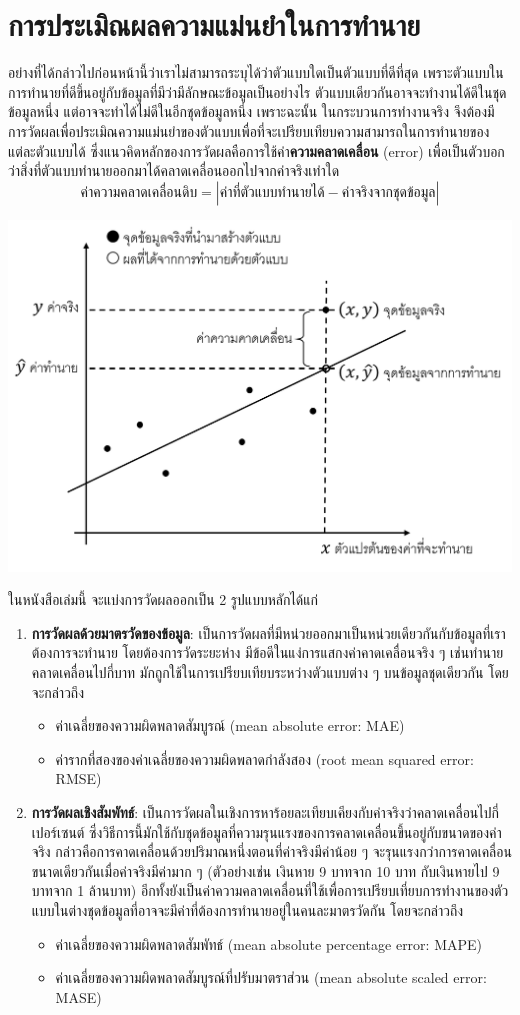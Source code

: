 \section{การประเมิณผลความแม่นยำในการทำนาย}
อย่างที่ได้กล่าวไปก่อนหน้านี้ว่าเราไม่สามารถระบุได้ว่าตัวแบบใดเป็นตัวแบบที่ดีที่สุด เพราะตัวแบบในการทำนายที่ดีขึ้นอยู่กับข้อมูลที่มีว่ามีลักษณะข้อมูลเป็นอย่างไร ตัวแบบเดียวกันอาจจะทำงานได้ดีในชุดข้อมูลหนึ่ง แต่อาจจะทำได้ไม่ดีในอีกชุดข้อมูลหนึ่ง เพราะฉะนั้น ในกระบวนการทำงานจริง จึงต้องมีการวัดผลเพื่อประเมิณความแม่นยำของตัวแบบเพื่อที่จะเปรียบเทียบความสามารถในการทำนายของแต่ละตัวแบบได้ ซึ่งแนวคิดหลักของการวัดผลคือการใช้ค่า\textbf{ความคลาดเคลื่อน} (error) เพื่อเป็นตัวบอกว่าสิ่งที่ตัวแบบทำนายออกมาได้คลาดเคลื่อนออกไปจากค่าจริงเท่าใด
\[
\text{ค่าความคลาดเคลื่อนดิบ} = \left|\text{ค่าที่ตัวแบบทำนายได้} - \text{ค่าจริงจากชุดข้อมูล}\right|
\]
\begin{center}
	\includegraphics[width=0.5\linewidth]{image/error_in_forecasting}
\end{center}
ในหนังสือเล่มนี้ จะแบ่งการวัดผลออกเป็น 2 รูปแบบหลักได้แก่
\begin{enumerate}
	\item \textbf{การวัดผลด้วยมาตรวัดของข้อมูล}: เป็นการวัดผลที่มีหน่วยออกมาเป็นหน่วยเดียวกันกับข้อมูลที่เราต้องการจะทำนาย โดยต้องการวัดระยะห่าง มีข้อดีในแง่การแสกงค่าคาดเคลื่อนจริง ๆ เช่นทำนายคลาดเคลื่อนไปกี่บาท มักถูกใช้ในการเปรียบเทียบระหว่างตัวแบบต่าง ๆ บนข้อมูลชุดเดียวกัน โดยจะกล่าวถึง
	\begin{itemize}
		\item ค่าเฉลี่ยของความผิดพลาดสัมบูรณ์ (mean absolute error: MAE)
		\item ค่ารากที่สองของค่าเฉลี่ยของความผิดพลาดกำลังสอง (root mean squared error: RMSE)
	\end{itemize}
	\item \textbf{การวัดผลเชิงสัมพัทธ์}: เป็นการวัดผลในเชิงการหาร้อยละเทียบเคียงกับค่าจริงว่าคลาดเคลื่อนไปกี่เปอร์เซนต์ ซึ่งวิธีการนี้มักใช้กับชุดข้อมูลที่ความรุนแรงของการคลาดเคลื่อนขึ้นอยู่กับขนาดของค่าจริง กล่าวคือการคาดเคลื่อนด้วยปริมาณหนึ่งตอนที่ค่าจริงมีค่าน้อย ๆ จะรุนแรงกว่าการคาดเคลื่อนขนาดเดียวกันเมื่อค่าจริงมีค่ามาก ๆ (ตัวอย่างเช่น เงินหาย 9 บาทจาก 10 บาท กับเงินหายไป 9 บาทจาก 1 ล้านบาท) อีกทั้งยังเป็นค่าความคลาดเคลื่อนที่ใช้เพื่อการเปรียบเที่ยบการทำงานของตัวแบบในต่างชุดข้อมูลที่อาจจะมีค่าที่ต้องการทำนายอยู่ในคนละมาตรวัดกัน โดยจะกล่าวถึง
	\begin{itemize}
		\item ค่าเฉลี่ยของความผิดพลาดสัมพัทธ์ (mean absolute percentage error: MAPE)
		\item ค่าเฉลี่ยของความผิดพลาดสัมบูรณ์ที่ปรับมาตราส่วน (mean absolute scaled error: MASE)
	\end{itemize}
\end{enumerate}

